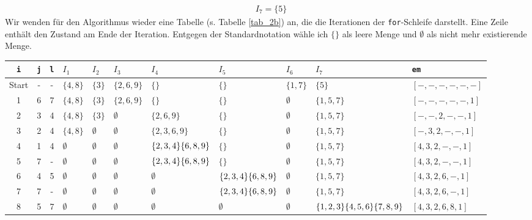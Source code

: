 \documentclass[a4paper,10pt]{article}
\begin{document}
\begin{enumerate}
\begin{align*}
	&I_7 = \{5\}
	\end{align*}
	Wir wenden für den Algorithmus wieder eine Tabelle (s. Tabelle \ref{tab_2b}) an, die die Iterationen der \texttt{for}-Schleife darstellt. Eine Zeile enthält den Zustand am Ende der Iteration. Entgegen der Standardnotation wähle ich $\{\}$ als leere Menge und $\emptyset$ als nicht mehr existierende Menge.
	\begin{table}[t]
	\centering
	\begin{tabular}{ c || c | c | l | l | l | p{1.5cm} | p{1.2cm} | l | p{1.2cm} || l }
	\texttt{i} & \texttt{j} & \texttt{l} & \textbf{$I_1$} & \textbf{$I_2$} & \textbf{$I_3$} & \textbf{$I_4$} & \textbf{$I_5$} & \textbf{$I_6$} & \textbf{$I_7$} & \texttt{em}\\
	\hline
	Start & - & - & $\{4, 8\}$ & $\{3\}$ & $\{2, 6, 9\}$ & $\{\}$ & $\{\}$ & $\{1, 7\}$ & $\{5\}$ & $[-, -, -, -, -, -]$ \\
	\hline
	1 & 6 & 7 & $\{4, 8\}$ & $\{3\}$ & $\{2, 6, 9\}$ & $\{\}$ & $\{\}$ & $\emptyset$ & $\{1, 5, 7\}$ & $[-, -, -, -, -, 1]$ \\
	\hline
	2 & 3 & 4 & $\{4, 8\}$ & $\{3\}$ & $\emptyset$ & $\{2, 6, 9\}$ & $\{\}$ & $\emptyset$ & $\{1, 5, 7\}$ & $[-, -, 2, -, -, 1]$ \\
	\hline
	3 & 2 & 4 & $\{4, 8\}$ & $\emptyset$ & $\emptyset$ & $\{2, 3, 6, 9\}$ & $\{\}$ & $\emptyset$ & $\{1, 5, 7\}$ & $[-, 3, 2, -, -, 1]$ \\
	\hline
	4 & 1 & 4 & $\emptyset$ & $\emptyset$ & $\emptyset$ & $\{2, 3, 4\} \newline\{6, 8, 9\}$ & $\{\}$ & $\emptyset$ & $\{1, 5, 7\}$ & $[4, 3, 2, -, -, 1]$ \\
	\hline
	5 & 7 & - & $\emptyset$ & $\emptyset$ & $\emptyset$ & $\{2, 3, 4\} \newline\{6, 8, 9\}$ & $\{\}$ & $\emptyset$ & $\{1, 5, 7\}$ & $[4, 3, 2, -, -, 1]$ \\
	\hline
	6 & 4 & 5 & $\emptyset$ & $\emptyset$ & $\emptyset$ & $\emptyset$ & $\{2, 3, 4\} \newline\{6, 8, 9\}$ & $\emptyset$ & $\{1, 5, 7\}$ & $[4, 3, 2, 6, -, 1]$ \\
	\hline
	7 & 7 & - & $\emptyset$ & $\emptyset$ & $\emptyset$ & $\emptyset$ & $\{2, 3, 4\} \newline\{6, 8, 9\}$ & $\emptyset$ & $\{1, 5, 7\}$ & $[4, 3, 2, 6, -, 1]$ \\
	\hline
	8 & 5 & 7 & $\emptyset$ & $\emptyset$ & $\emptyset$ & $\emptyset$ & $\emptyset$ & $\emptyset$ & $\{1, 2, 3\} \newline \{4, 5, 6\} \newline \{7, 8, 9\}$ & $[4, 3, 2, 6, 8, 1]$ \\

\end{tabular}
\end{table}
\end{enumerate}
\end{document}
